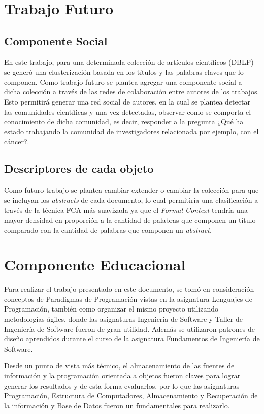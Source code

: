 \documentclass[12pt,oneside,letterpaper]{book}
\newcommand{\eng}[1]{\textit{#1}\xspace}			%
\newcommand{\abr}[1]{\textsc{#1}\xspace}           %
\theoremstyle{definition}
\begin{document}
\section{Trabajo Futuro}
\subsection{Componente Social}
En este trabajo, para una determinada colección de artículos científicos (\abr{DBLP}) se generó una clusterización basada en los títulos y las palabras claves que lo componen. Como trabajo futuro se plantea agregar una componente social a dicha colección a través de las redes de colaboración entre autores de los trabajos. Esto permitirá generar una red social de autores, en la cual se plantea detectar las comunidades científicas y una vez detectadas, observar como se comporta el conocimiento de dicha comunidad, es decir, responder a la pregunta ¿Qué ha estado trabajando la comunidad de investigadores relacionada por ejemplo, con el cáncer?.

\subsection{Descriptores de cada objeto}
Como futuro trabajo se plantea cambiar extender o cambiar la colección para que se incluyan los \eng{abstracts} de cada documento, lo cual permitiría una clasificación a través de la técnica {FCA} más suavizada ya que el \eng{Formal Context} tendría una mayor densidad en proporción a la cantidad de palabras que componen un título comparado con la cantidad de palabras que componen un \eng{abstract}.


\section{Componente Educacional}
Para realizar el trabajo presentado en este documento, se tomó en consideración conceptos de Paradigmas de Programación vistas en la asignatura Lenguajes de Programación, también como organizar el mismo proyecto utilizando metodologías ágiles, donde las asignaturas Ingeniería de Software y Taller de Ingeniería de Software fueron de gran utilidad. Además se utilizaron patrones de diseño aprendidos durante el curso de la asignatura Fundamentos de Ingeniería de Software.

Desde un punto de vista más técnico, el almacenamiento de las fuentes de información y la programación orientada a objetos fueron claves para lograr generar los resultados y de esta forma evaluarlos, por lo que las asignaturas Programación, Estructura de Computadores, Almacenamiento y Recuperación de la información y Base de Datos fueron un fundamentales para realizarlo.
\end{document}
